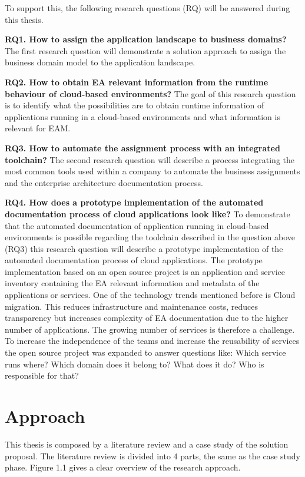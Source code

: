 To support this, the following research questions (RQ) will be answered during this thesis.

\textbf{RQ1. How to assign the application landscape to business domains?}
The first research question will demonstrate a solution approach to assign the business domain model to the application landscape.

\textbf{RQ2. How to obtain EA relevant information from the runtime behaviour of cloud-based environments?}
The goal of this research question is to identify what the possibilities are to obtain runtime information of applications running in a cloud-based environments and what information is relevant for EAM.

\textbf{RQ3. How to automate the assignment process with an integrated toolchain?}
The second research question will describe a process integrating the most common tools used within a company to automate the business assignments and the enterprise architecture documentation process.

\textbf{RQ4. How does a prototype implementation of the automated documentation process of cloud applications look like?}
To demonstrate that the automated documentation of application running in cloud-based environments is possible regarding the toolchain described in the question above (RQ3) this research question will describe a prototype implementation of the automated documentation process of cloud applications. The prototype implementation based on an open source project is an application and service inventory containing the EA relevant information and metadata of the applications or services. One of the technology trends mentioned before is Cloud migration. This reduces infrastructure and maintenance costs, reduces transparency but increases complexity of EA documentation due to the higher number of applications. The growing number of services is therefore a challenge. To increase the independence of the teams and increase the reusability of services the open source project was expanded to answer questions like: Which service runs where? Which domain does it belong to? What does it do? Who is responsible for that?


\section{Approach}
This thesis is composed by a literature review and a case study of the solution proposal. The literature review is divided into 4 parts, the same as the case study phase. Figure 1.1 gives a clear overview of the research approach.

